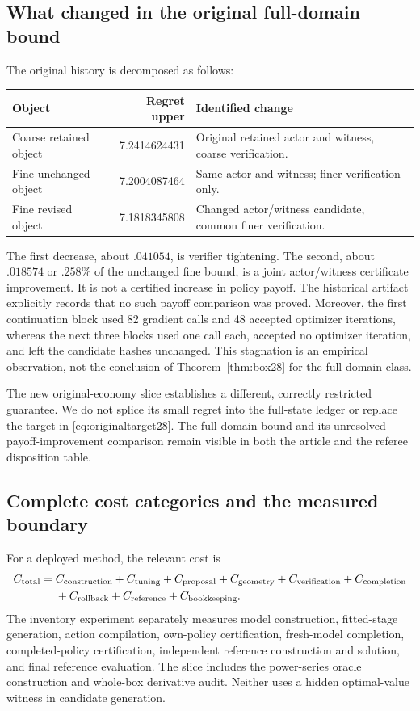 \subsection{What changed in the original full-domain bound}
The original history is decomposed as follows:
\begin{center}\small
\begin{tabular}{p{.25\linewidth}rp{.46\linewidth}}\toprule
Object & Regret upper & Identified change\\\midrule
Coarse retained object & 7.2414624431 & Original retained actor and witness, coarse verification.\\
Fine unchanged object & 7.2004087464 & Same actor and witness; finer verification only.\\
Fine revised object & 7.1818345808 & Changed actor/witness candidate, common finer verification.\\\bottomrule
\end{tabular}
\end{center}
The first decrease, about $.041054$, is verifier tightening. The second, about $.018574$ or $.258\%$ of the unchanged fine bound, is a joint actor/witness certificate improvement. It is not a certified increase in policy payoff. The historical artifact explicitly records that no such payoff comparison was proved. Moreover, the first continuation block used 82 gradient calls and 48 accepted optimizer iterations, whereas the next three blocks used one call each, accepted no optimizer iteration, and left the candidate hashes unchanged. This stagnation is an empirical observation, not the conclusion of Theorem~\ref{thm:box28} for the full-domain class.

The new original-economy slice establishes a different, correctly restricted guarantee. We do not splice its small regret into the full-state ledger or replace the target in \eqref{eq:originaltarget28}. The full-domain bound and its unresolved payoff-improvement comparison remain visible in both the article and the referee disposition table.

\subsection{Complete cost categories and the measured boundary}
For a deployed method, the relevant cost is
\begin{align}\label{eq:cost28}
 C_{\rm total}={}&C_{\rm construction}+C_{\rm tuning}+C_{\rm proposal}
 +C_{\rm geometry}+C_{\rm verification}+C_{\rm completion}\\
 &+C_{\rm rollback}+C_{\rm reference}+C_{\rm bookkeeping}.\nonumber
\end{align}
The inventory experiment separately measures model construction, fitted-stage generation, action compilation, own-policy certification, fresh-model completion, completed-policy certification, independent reference construction and solution, and final reference evaluation. The slice includes the power-series oracle construction and whole-box derivative audit. Neither uses a hidden optimal-value witness in candidate generation.

